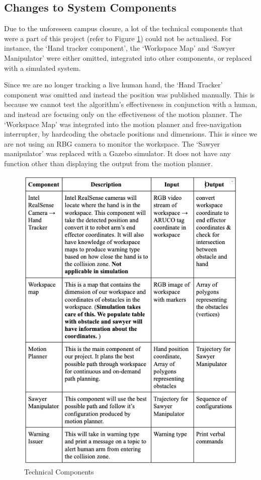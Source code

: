 \subsection{Changes to System Components}
Due to the unforeseen campus closure, a lot of the technical components that were a part of this project (refer to Figure \ref{fig:TechnicalComponents}) could not be actualised. 
For instance, the `Hand tracker component', the `Workspace Map' and `Sawyer Manipulator' were either omitted, integrated into other components, or replaced with a simulated system.

Since we are no longer tracking a live human hand, the `Hand Tracker' component was omitted and instead the position was published manually. 
This is because we cannot test the algorithm's effectiveness in conjunction with a human, and instead are focusing only on the effectiveness of the motion planner. 
The `Workspace Map' was integrated into the motion planner and free-navigation interrupter, by hardcoding the obstacle positions and dimensions. 
This is since we are not using an RBG camera to monitor the workspace.  
The `Sawyer manipulator' was replaced with a Gazebo simulator. 
It does not have any function other than displaying the output from the motion planner.
\begin{figure}[H]
\includegraphics[width=\linewidth]{img/techcomponent.png}
\caption{Technical Components}
\label{fig:TechnicalComponents}
\end{figure}
